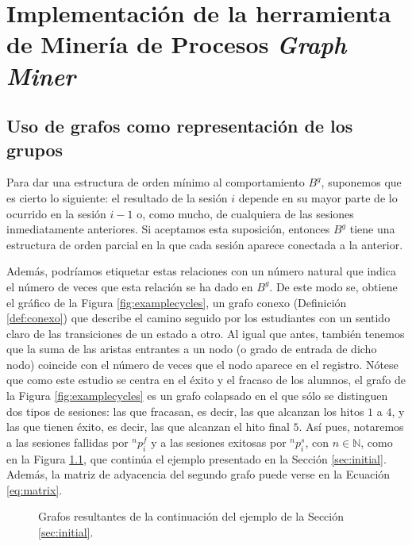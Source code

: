 \chapter{Implementación de la herramienta de Minería de Procesos \emph{Graph Miner}}\label{sec:chapterIV}

\section{Uso de grafos como representación de los grupos}\label{sec:representation}

Para dar una estructura de orden mínimo al comportamiento $B^g$, suponemos que es cierto lo siguiente: el resultado de la sesión $i$ depende en su mayor parte de lo ocurrido en la sesión $i-1$ o, como mucho, de cualquiera de las sesiones inmediatamente anteriores. Si aceptamos esta suposición, entonces $B^g$ tiene una estructura de orden parcial en la que cada sesión aparece conectada a la anterior.

Además, podríamos etiquetar estas relaciones con un número natural que indica el número de veces que esta relación se ha dado en $B^g$. De este modo se, obtiene el gráfico de la Figura \ref{fig:examplecycles}, un grafo conexo (Definición \ref{def:conexo}) que describe el camino seguido por los estudiantes con un sentido claro de las transiciones de un estado a otro. Al igual que antes, también tenemos que la suma de las aristas entrantes a un nodo (o grado de entrada de dicho nodo) coincide con el número de veces que el nodo aparece en el registro. Nótese que como este estudio se centra en el éxito y el fracaso de los alumnos, el grafo de la Figura \ref{fig:examplecycles} es un grafo colapsado en el que sólo se distinguen dos tipos de sesiones: las que fracasan, es decir, las que alcanzan los hitos $1$ a $4$, y las que tienen éxito, es decir, las que alcanzan el hito final $5$. Así pues, notaremos a las sesiones fallidas por $^np_i^f$ y a las sesiones exitosas por $^np_i^s$, con $n \in \mathbb{N}$, como en la Figura \ref{fig:examples}, que continúa el ejemplo presentado en la Sección \ref{sec:initial}. Además, la matriz de adyacencia del segundo grafo puede verse en la Ecuación \ref{eq:matrix}.

\begin{figure}[H]
\centering
{}\qquad
{}
\caption{Grafos resultantes de la continuación del ejemplo de la Sección \ref{sec:initial}.}
\label{fig:examples}
\end{figure}

